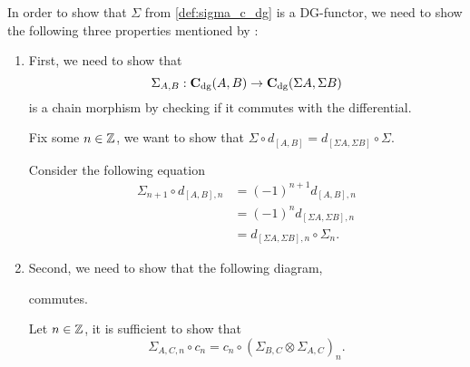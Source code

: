 \begin{remark}
    In order to show that \( \Sigma \) from \autoref{def:sigma_c_dg} is a DG-functor, we need to show the following three properties mentioned by \cite[Definition 6.2.3]{Borceux_1994}:
    \begin{enumerate}
        \item {
            First, we need to show that
            \[
                \Sigma_{A, B}: \operatorname{\mathbf{C}}_{\operatorname{dg}}(A, B) \to \operatorname{\mathbf{C}}_{\operatorname{dg}}(\Sigma A, \Sigma B)
            \]
            is a chain morphism by checking if it commutes with the differential.

            Fix some \( n \in {\mathbb{Z}} \), we want to show that \( \Sigma \circ d_{[A, B]} = d_{[\Sigma A, \Sigma B]} \circ \Sigma \).

            Consider the following equation
            \begin{align*}
                \Sigma_{n + 1} \circ d_{[A, B], n} &= (-1)^{n + 1} d_{[A, B], n} \\
                &= (-1)^n d_{[\Sigma A, \Sigma B], n} \\
                &= d_{[\Sigma A, \Sigma B], n} \circ \Sigma_n.
            \end{align*}
        }
        \item {
            Second, we need to show that the following diagram,
            \begin{center}
            \end{center}
            commutes.

            Let \( n \in {\mathbb{Z}} \), it is sufficient to show that
            \[
                \Sigma_{A, C, n} \circ c_n = c_n \circ (\Sigma_{B, C} \otimes \Sigma_{A, C})_n.
            \]

}
\end{enumerate}
\end{remark}
